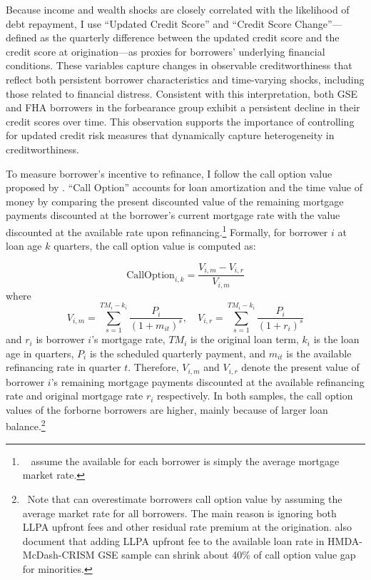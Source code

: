 \documentclass[11pt]{article}
\begin{document}
Because income and wealth shocks are closely correlated with the likelihood of debt repayment, I use ``Updated Credit Score'' and ``Credit Score Change''—defined as the quarterly difference between the updated credit score and the credit score at origination—as proxies for borrowers’ underlying financial conditions. These variables capture changes in observable creditworthiness that reflect both persistent borrower characteristics and time-varying shocks, including those related to financial distress. Consistent with this interpretation, both GSE and FHA borrowers in the forbearance group exhibit a persistent decline in their credit scores over time. This observation supports the importance of controlling for updated credit risk measures that dynamically capture heterogeneity in creditworthiness.  


To measure borrower's incentive to refinance, I follow the call option value proposed by \citet{deng2000mortgage}. ``Call Option'' accounts for loan amortization and the time value of money by comparing the present discounted value of the remaining mortgage payments discounted at the borrower's current mortgage rate with the value discounted at the available rate upon refinancing.\footnote{~\citet{deng2000mortgage} assume the available for each borrower is simply the average mortgage market rate.} Formally, for borrower $i$ at loan age $k$ quarters, the call option value is computed as:

\[
\text{CallOption}_{i,k} = \frac{V_{i,m} - V_{i,r}}{V_{i,m}}
\]
where
\[
V_{i,m} = \sum_{s=1}^{TM_i - k_i} \frac{P_i}{(1 + m_{it})^s}, \quad V_{i,r} = \sum_{s=1}^{TM_i - k_i} \frac{P_i}{(1 + r_i)^s}
\]
and $r_i$ is borrower $i$'s mortgage rate, $TM_i$ is the original loan term, $k_i$ is the loan age in quarters, $P_i$ is the scheduled quarterly payment, and $m_{it}$ is the available refinancing rate in quarter $t$. Therefore, $V_{i,m}$ and $V_{i,r}$ denote the present value of borrower $i$'s remaining mortgage payments discounted at the available refinancing rate and original mortgage rate $r_i$ respectively. In both samples, the call option values of the forborne borrowers are higher, mainly because of larger loan balance.\footnote{~Note that \citet{deng2000mortgage} can overestimate borrowers call option value by assuming the average market rate for all borrowers. The main reason is ignoring both LLPA upfront fees and other residual rate premium at the origination. \citet{gerardi2023mortgage} also document that adding LLPA upfront fee to the available loan rate in HMDA-McDash-CRISM GSE sample can shrink about 40\% of call option value gap for  minorities.}  
\end{document}

